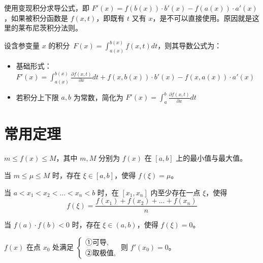 \documentclass[lang=cn,math=mtpro2,10pt,scheme=chinese,black]{elegantbook}
\begin{document}
\begin{note}
使用变现积分求导公式，即 \(\displaystyle F'(x) = f(b(x)) \cdot b'(x) - f(a(x)) \cdot a'(x)\)，如果被积分函数是 \(\displaystyle f(x, t)\)，即既有 \(t\) 又有 \(x\)，是不可以直接使用。原因就是这里的莱布尼茨积分法则。
\end{note}
设含参变量 \(x\) 的积分 \(\displaystyle F(x) = \int_{a(x)}^{b(x)} f(x, t) dt\)，则其导数公式为：
\begin{itemize}
  \item 基础形式：\(\displaystyle F'(x) = \int_{a(x)}^{b(x)} \frac{\partial f(x, t)}{\partial x} dt + f(x, b(x)) \cdot b'(x) - f(x, a(x)) \cdot a'(x)\)
  \item 若积分上下限 \(\displaystyle a, b\) 为常数，简化为 \(\displaystyle F'(x) = \int_{a}^{b} \frac{\partial f(x, t)}{\partial x} dt\)
\end{itemize}




\section{常用定理}

\begin{theorem}[有界与最值定理]
    $m \le f(x) \le M$，其中 $m, M$ 分别为 $f(x)$ 在 $[a, b]$ 上的最小值与最大值。
\end{theorem}

\begin{theorem}[介值定理]
    当 $m \le \mu \le M$ 时，存在 $\xi \in [a, b]$，使得 $f(\xi) = \mu$。
\end{theorem}

\begin{theorem}[平均值定理]
    当 $a < x_1 < x_2 < \dots < x_n < b$ 时，在 $[x_1, x_n]$ 内至少存在一点 $\xi$，使得
$$ f(\xi) = \frac{f(x_1) + f(x_2) + \dots + f(x_n)}{n} $$
\end{theorem}

\begin{theorem}[零点定理]
 当 $f(a) \cdot f(b) < 0$ 时，存在 $\xi \in (a, b)$，使得 $f(\xi) = 0$。
\end{theorem}

\begin{theorem}[费马定理]
     $f(x)$ 在点 $x_0$ 处满足
$\begin{cases}
    \text{①可导,} \\
    \text{②取极值,}
\end{cases}$
则 $f'(x_0) = 0$。
\end{theorem}
\end{document}
